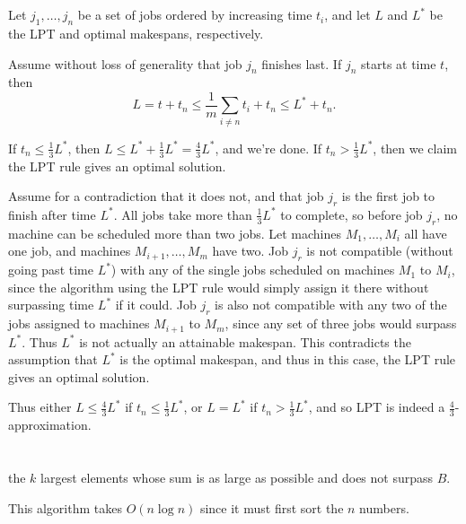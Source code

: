 \documentclass[11pt]{article}
\begin{document}
\section{} %
Let $j_1, \ldots, j_n$ be a set of jobs ordered by increasing time $t_i$, and let $L$ and $L^*$ be the LPT and optimal makespans, respectively.

Assume without loss of generality that job $j_n$ finishes last.
If $j_n$ starts at time $t$, then
\[L = t + t_n \le \frac{1}{m}\sum_{i \neq n} t_i + t_n \le L^* + t_n.\]

If $t_n \le \frac{1}{3} L^*$, then $L \le L^* + \frac{1}{3} L^* = \frac{4}{3} L^*$, and we're done.
If $t_n > \frac{1}{3} L^*$, then we claim the LPT rule gives an optimal solution.

Assume for a contradiction that it does not, and that job $j_r$ is the first job to finish after time $L^*$.
All jobs take more than $\frac{1}{3} L^*$ to complete, so before job $j_r$, no machine can be scheduled more than two jobs.
Let machines $M_1, \ldots, M_i$ all have one job, and machines $M_{i+1}, \ldots, M_m$ have two.
Job $j_r$ is not compatible (without going past time $L^*$) with any of the single jobs scheduled on machines $M_1$ to $M_i$, since the algorithm using the LPT rule would simply assign it there without surpassing time $L^*$ if it could.
Job $j_r$ is also not compatible with any two of the jobs assigned to machines $M_{i+1}$ to $M_m$, since any set of three jobs would surpass $L^*$.
Thus $L^*$ is not actually an attainable makespan.
This contradicts the assumption that $L^*$ is the optimal makespan, and thus in this case, the LPT rule gives an optimal solution.

Thus either $L \le \frac{4}{3} L^*$ if $t_n \le \frac{1}{3} L^*$, or $L = L^*$ if $t_n > \frac{1}{3} L^*$, and so LPT is indeed a $\frac{4}{3}$-approximation.


\section{} %
\begin{algorithm}
\begin{algorithmic}
\State \Return the $k$ largest elements whose sum is as large as possible and does not surpass $B$.
\EndFunction
\end{algorithmic}
\end{algorithm}

This algorithm takes $O(n \log n)$ since it must first sort the $n$ numbers.
\end{document}
